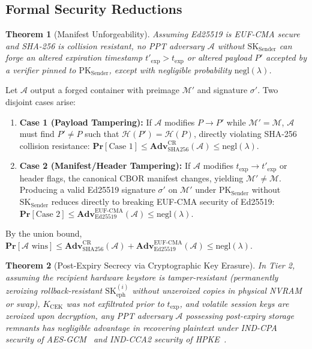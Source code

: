 \subsection{Formal Security Reductions}
\newtheorem{theorem}{Theorem}

\begin{theorem}[Manifest Unforgeability]
Assuming Ed25519 is EUF-CMA secure~\cite{brendel2021provable} and SHA-256 is collision resistant, no PPT adversary $\mathcal{A}$ without $\text{SK}_{\text{Sender}}$ can forge an altered expiration timestamp $t'_{\text{exp}} > t_{\text{exp}}$ or altered payload $P'$ accepted by a verifier pinned to $\text{PK}_{\text{Sender}}$, except with negligible probability $\text{negl}(\lambda)$.
\end{theorem}

\begin{IEEEproof}
Let $\mathcal{A}$ output a forged container with preimage $\mathcal{M}'$ and signature $\sigma'$. Two disjoint cases arise:
\begin{enumerate}
    \item \textbf{Case 1 (Payload Tampering):} If $\mathcal{A}$ modifies $P \to P'$ while $\mathcal{M}' = \mathcal{M}$, $\mathcal{A}$ must find $P' \ne P$ such that $\mathcal{H}(P') = \mathcal{H}(P)$, directly violating SHA-256 collision resistance: $\mathbf{Pr}[\text{Case 1}] \le \mathbf{Adv}^{\text{CR}}_{\text{SHA256}}(\mathcal{A}) \le \text{negl}(\lambda)$.
    \item \textbf{Case 2 (Manifest/Header Tampering):} If $\mathcal{A}$ modifies $t_{\text{exp}} \to t'_{\text{exp}}$ or header flags, the canonical CBOR manifest changes, yielding $\mathcal{M}' \ne \mathcal{M}$. Producing a valid Ed25519 signature $\sigma'$ on $\mathcal{M}'$ under $\text{PK}_{\text{Sender}}$ without $\text{SK}_{\text{Sender}}$ reduces directly to breaking EUF-CMA security of Ed25519: $\mathbf{Pr}[\text{Case 2}] \le \mathbf{Adv}^{\text{EUF-CMA}}_{\text{Ed25519}}(\mathcal{A}) \le \text{negl}(\lambda)$.
\end{enumerate}
By the union bound, $\mathbf{Pr}[\mathcal{A} \text{ wins}] \le \mathbf{Adv}^{\text{CR}}_{\text{SHA256}}(\mathcal{A}) + \mathbf{Adv}^{\text{EUF-CMA}}_{\text{Ed25519}}(\mathcal{A}) \le \text{negl}(\lambda)$.
\end{IEEEproof}

\begin{theorem}[Post-Expiry Secrecy via Cryptographic Key Erasure]
In Tier 2, assuming the recipient hardware keystore is tamper-resistant (permanently zeroizing rollback-resistant $\text{SK}_{\text{eph}}^{(i)}$ without unzeroized copies in physical NVRAM or swap), $K_{\text{CEK}}$ was not exfiltrated prior to $t_{\text{exp}}$, and volatile session keys are zeroized upon decryption, any PPT adversary $\mathcal{A}$ possessing post-expiry storage remnants has negligible advantage in recovering plaintext under IND-CPA security of AES-GCM~\cite{mcgrew2004security} and IND-CCA2 security of HPKE~\cite{rfc9180hpke}.
\end{theorem}

